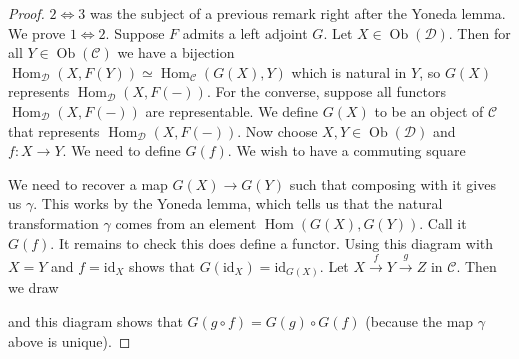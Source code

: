 \documentclass{article}
\newcommand{\id}{\mathrm{id}}
\newcommand{\cat}{\mathcal{C}}
\newcommand{\catt}{\mathcal{D}}
\DeclareMathOperator{\Ob}{Ob}
\DeclareMathOperator{\Hom}{Hom}
\theoremstyle{plain}
\theoremstyle{definition}
\theoremstyle{remark}
\begin{document}
\begin{proof}
    $2 \iff 3$ was the subject of a previous remark right after the Yoneda lemma. We prove $1 \iff 2$. Suppose $F$ admits a left adjoint $G$. Let $X \in \Ob(\catt)$. Then for all $Y \in \Ob(\cat)$ we have a bijection $\Hom_\catt(X,F(Y)) \simeq \Hom_\cat(G(X),Y)$ which is natural in $Y$, so $G(X)$ represents $\Hom_\catt(X,F(-))$. For the converse, suppose all functors $\Hom_\catt(X,F(-))$ are representable. We define $G(X)$ to be an object of $\cat$ that represents $\Hom_\catt(X,F(-))$. Now choose $X,Y \in \Ob(\catt)$ and $f : X \to Y$. We need to define $G(f)$. We wish to have a commuting square
    \begin{center}
    \end{center}
    We need to recover a map $G(X) \to G(Y)$ such that composing with it gives us $\gamma$. This works by the Yoneda lemma, which tells us that the natural transformation $\gamma$ comes from an element $\Hom(G(X),G(Y))$. Call it $G(f)$. It remains to check this does define a functor. Using this diagram with $X=Y$ and $f = \id_X$ shows that $G(\id_X)= \id_{G(X)}$. Let $X \xrightarrow{f} Y \xrightarrow{g} Z$ in $\cat$. Then we draw
    \begin{center}
    \end{center}
    and this diagram shows that $G(g\circ f) = G(g) \circ G(f)$ (because the map $\gamma$ above is unique).
\end{proof}
\end{document}

